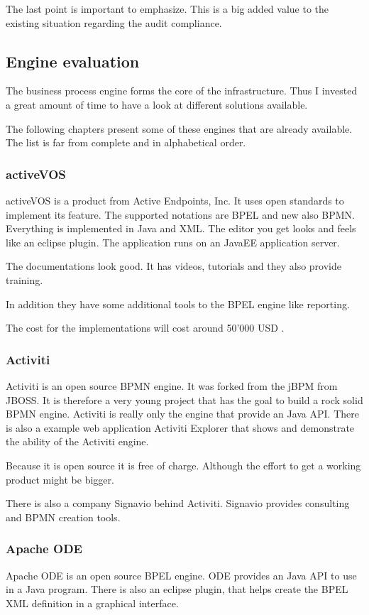 \documentclass[paper=a4,twoside=false,BCOR=0mm,DIV=calc,fontsize=12pt]{scrartcl}
\begin{document}
The last point is important to emphasize. This is a big added value to the existing situation regarding the audit compliance.

\subsection{Engine evaluation}
The business process engine forms the core of the infrastructure. Thus I invested a great amount of time to have a look at different solutions available.

The following chapters present some of these engines that are already available. The list is far from complete and in alphabetical order.

\subsubsection{activeVOS}
activeVOS \cite{activevos} is a product from Active Endpoints, Inc. It uses open standards to implement its feature. The supported notations are BPEL and new also BPMN. Everything is implemented in Java and XML. The editor you get looks and feels like an eclipse plugin. The application runs on an JavaEE application server.

The documentations look good. It has videos, tutorials and they also provide training. 

In addition they have some additional tools to the BPEL engine like reporting.

The cost for the implementations will cost around 50'000 USD \cite{activvosscost}.


\subsubsection{Activiti}
Activiti \cite{activiti} is an open source BPMN engine. It was forked from the jBPM \cite{jbpm} from JBOSS. It is therefore a very young project that has the goal to build a rock solid BPMN engine. Activiti is really only the engine that provide an Java API. There is also a example web application Activiti Explorer that shows and demonstrate the ability of the Activiti engine.

Because it is open source it is free of charge. Although the effort to get a working product might be bigger. 

There is also a company Signavio \cite{signavio} behind Activiti. Signavio provides consulting and BPMN creation tools.

\subsubsection{Apache ODE}
Apache ODE \cite{appacheODE} is an open source BPEL engine. ODE provides an Java API to use in a Java program.
There is also an eclipse plugin, that helps create the BPEL XML definition in a graphical interface.
\end{document}

